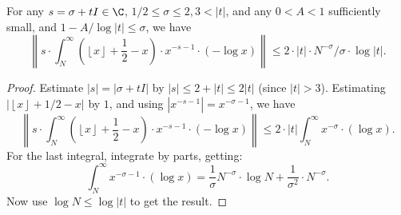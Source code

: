 \begin{lemma}
\label{DerivUpperBnd_aux7}
\leanok
For any $s = \sigma + tI \in \C$, $1/2 \le \sigma\le 2, 3 < |t|$, and any $0 < A < 1$
  sufficiently small, and $1-A/\log |t| \le \sigma$, we have
  $$
  \left\|s \cdot \int_{N}^{\infty}
    \left(\left\lfloor x \right\rfloor + \frac{1}{2} - x\right) \cdot x^{-s-1} \cdot (-\log x)
  \right\|
  \le 2 \cdot |t| \cdot N^{-\sigma} / \sigma \cdot \log |t|.
  $$
\end{lemma}
\begin{proof}
\leanok
Estimate $|s|= |\sigma + tI|$ by $|s|\le 2 +|t| \le 2|t|$ (since $|t|>3$).
  Estimating $|\left\lfloor x \right\rfloor+1/2-x|$ by $1$,
  and using $|x^{-s-1}| = x^{-\sigma-1}$, we have
  $$
  \left\| s \cdot \int_{N}^{\infty}
    \left(\left\lfloor x \right\rfloor + \frac{1}{2} - x\right) \cdot x^{-s-1} \cdot (-\log x)
  \right\|
  \le 2 \cdot |t|
  \int_{N}^{\infty} x^{-\sigma} \cdot (\log x).
  $$
  For the last integral, integrate by parts, getting:
  $$
  \int_{N}^{\infty} x^{-\sigma-1} \cdot (\log x) =
  \frac{1}{\sigma}N^{-\sigma} \cdot \log N + \frac1{\sigma^2} \cdot N^{-\sigma}.
  $$
  Now use $\log N \le \log |t|$ to get the result.
\end{proof}
